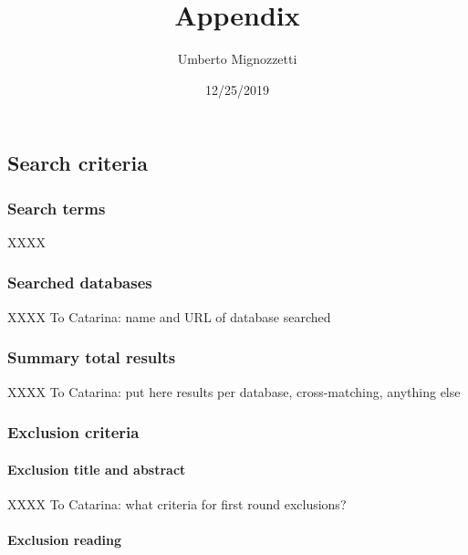 \documentclass[
]{article}
\title{Appendix}
\author{Umberto Mignozzetti}
\date{12/25/2019}
\begin{document}
\maketitle

\tableofcontents

\hypertarget{search-criteria}{%
\subsection{Search criteria}\label{search-criteria}}

\hypertarget{search-terms}{%
\subsubsection{Search terms}\label{search-terms}}

XXXX

\hypertarget{searched-databases}{%
\subsubsection{Searched databases}\label{searched-databases}}

XXXX To Catarina: name and URL of database searched

\hypertarget{summary-total-results}{%
\subsubsection{Summary total results}\label{summary-total-results}}

XXXX To Catarina: put here results per database, cross-matching,
anything else

\hypertarget{exclusion-criteria}{%
\subsubsection{Exclusion criteria}\label{exclusion-criteria}}

\hypertarget{exclusion-title-and-abstract}{%
\paragraph{Exclusion title and
abstract}\label{exclusion-title-and-abstract}}

XXXX To Catarina: what criteria for first round exclusions?

\hypertarget{exclusion-reading}{%
\paragraph{Exclusion reading}\label{exclusion-reading}}
\end{document}
